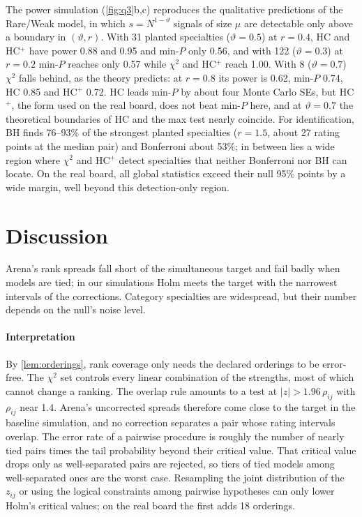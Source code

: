 \documentclass[12pt]{article}
\begin{document}
The power simulation (\cref{fig:q3}b,c) reproduces the qualitative predictions of the Rare/Weak model, in which $s = N^{1-\vartheta}$ signals of size $\mu$ are detectable only above a boundary in $(\vartheta, r)$. With 31 planted specialties ($\vartheta = 0.5$) at $r = 0.4$, HC and HC$^+$ have power 0.88 and 0.95 and min-$P$ only 0.56, and with 122 ($\vartheta = 0.3$) at $r = 0.2$ min-$P$ reaches only 0.57 while $\chi^2$ and HC$^+$ reach 1.00. With 8 ($\vartheta = 0.7$) $\chi^2$ falls behind, as the theory predicts: at $r = 0.8$ its power is 0.62, min-$P$ 0.74, HC 0.85 and HC$^+$ 0.72. HC leads min-$P$ by about four Monte Carlo SEs, but HC$^+$, the form used on the real board, does not beat min-$P$ here, and at $\vartheta = 0.7$ the theoretical boundaries of HC and the max test nearly coincide. For identification, BH finds 76--93\% of the strongest planted specialties ($r = 1.5$, about 27 rating points at the median pair) and Bonferroni about 53\%; in between lies a wide region where $\chi^2$ and HC$^+$ detect specialties that neither Bonferroni nor BH can locate. On the real board, all global statistics exceed their null 95\% points by a wide margin, well beyond this detection-only region.

\section{Discussion}\label{sec:discussion}

Arena's rank spreads fall short of the simultaneous target and fail badly when models are tied; in our simulations Holm meets the target with the narrowest intervals of the corrections. Category specialties are widespread, but their number depends on the null's noise level.

\paragraph{Interpretation} By \cref{lem:orderings}, rank coverage only needs the declared orderings to be error-free. The $\chi^2$ set controls every linear combination of the strengths, most of which cannot change a ranking. The overlap rule amounts to a test at $|z| > 1.96\,\rho_{ij}$ with $\rho_{ij}$ near 1.4. Arena's uncorrected spreads therefore come close to the target in the baseline simulation, and no correction separates a pair whose rating intervals overlap. The error rate of a pairwise procedure is roughly the number of nearly tied pairs times the tail probability beyond their critical value. That critical value drops only as well-separated pairs are rejected, so tiers of tied models among well-separated ones are the worst case. Resampling the joint distribution of the $z_{ij}$ \citep{romano2005exact, mogstad2024inference} or using the logical constraints among pairwise hypotheses \citep{shaffer1986modified} can only lower Holm's critical values; on the real board the first adds 18 orderings.
\end{document}
